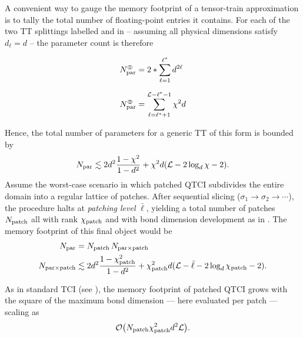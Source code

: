 A convenient way to gauge the memory footprint of a tensor-train approximation is to tally the total number of floating-point entries it contains. For each of the two TT splittings labelled  and  in  -- assuming all physical dimensions satisfy $d_\ell = d$ -- the parameter count is therefore

\begin{equation}
	\begin{aligned}
		N^{\raisebox{.5pt}{\tiny \textcircled{\raisebox{-0.6pt} {1}}}}_{\text{par}} &= 2 *\sum\limits_{\ell = 1}^{\ell^*} d^{2\ell}  \\[6pt]
		N^{\raisebox{.5pt}{\tiny \textcircled{\raisebox{-0.6pt} {2}}}}_{\text{par}} &= \sum\limits_{\ell = \ell^* + 1}^{\mL - \ell^* - 1} \chi^2d
	\end{aligned}
\end{equation}

Hence, the total number of parameters for a generic TT of this form is bounded by
\begin{equation} 
	N_{\text{par}} \lesssim 2 d^2 \frac{1 - \chi^2 }{1 - d^2} + \chi^2d (\mathcal{L} - 2 \log_d \chi - 2). 
\end{equation}
Assume the worst-case scenario in which patched QTCI subdivides the entire domain into a regular lattice of patches.  After sequential slicing ($\sigma_1 \to \sigma_2 \to \cdots$), the procedure halts at \textit{patching level} ${\bar \ell}$, yielding a total number of patches $N_{\text{patch}}$ all with rank $\chi_{\text{patch}}$ and with bond dimension development as in . The memory footprint of this final object would be 
\begin{equation}
	\begin{aligned}
		N_{\text{par}} &= N_{\text{patch}}\, N_{\text{par}\times \text{patch}}\\
		N_{\text{par}\times \text{patch}} &\lesssim  2 d^2 \frac{1 - \chi_{\text{patch}}^2 }{1 - d^2} + \chi_{\text{patch}}^2d (\mathcal{L} - {\bar \ell} - 2 \log_d \chi_{\text{patch}} - 2).
	\end{aligned}
	\label{eq:patchMemoryEstimate}
\end{equation}

As in standard TCI (see ), the memory footprint of patched QTCI grows with the square of the maximum bond dimension — here evaluated per patch — scaling as  
\begin{equation}
	\mathcal{O}\bigl(N_{\text{patch}} \chi_{\text{patch}}^2 d^2 \mathcal{L}\bigr). 
	\label{eq:PatchMemoryScaling}
\end{equation}

